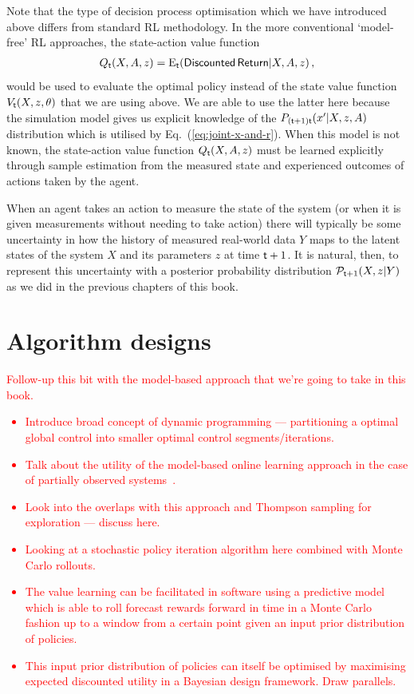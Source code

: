 Note that the type of decision process optimisation which we have introduced above differs from standard RL methodology. In the more conventional `model-free' RL approaches, the state-action value function 
\begin{align}
Q_{{\sf t}}(X,A,z)={\rm E}_{{\sf t}}({\sf Discounted \,Return}\vert X,A,z) \,,
\end{align}
would be used to evaluate the optimal policy instead of the state value function $V_{{\sf t}}(X,z,\theta )$ that we are using above. We are able to use the latter here because the simulation model gives us explicit knowledge of the $P_{({\sf t}+1){\sf t}}(x'\vert X,z,A)$ distribution which is utilised by Eq.~(\ref{eq:joint-x-and-r}). When this model is not known, the state-action value function $Q_{{\sf t}}(X,A,z)$ must be learned explicitly through sample estimation from the measured state and experienced outcomes of actions taken by the agent.

When an agent takes an action to measure the state of the system (or when it is given measurements without needing to take action) there will typically be some uncertainty in how the history of measured real-world data $Y$ maps to the latent states of the system $X$ and its parameters $z$ at time ${\sf t}+1$. It is natural, then, to represent this uncertainty with a posterior probability distribution ${\cal P}_{{\sf t}+1}(X,z\vert Y)$ as we did in the previous chapters of this book.

\section{\sffamily Algorithm designs}

\textcolor{red}{
Follow-up this bit with the model-based approach that we're going to take in this book.
\begin{itemize}
\item{Introduce broad concept of dynamic programming --- partitioning a optimal global control into smaller optimal control segments/iterations.}
\item{Talk about the utility of the model-based online learning approach in the case of partially observed systems~\cite{aastrom1965optimal}.}
\item{Look into the overlaps with this approach and Thompson sampling for exploration --- discuss here.}
\item{Looking at a stochastic policy iteration algorithm here combined with Monte Carlo rollouts.}
\item{The value learning can be facilitated in software using a predictive model which is able to roll forecast rewards forward in time in a Monte Carlo fashion up to a window from a certain point given an input prior distribution of policies.}
\item{This input prior distribution of policies can itself be optimised by maximising expected discounted utility in a Bayesian design framework. Draw parallels.}
\end{itemize}
}

